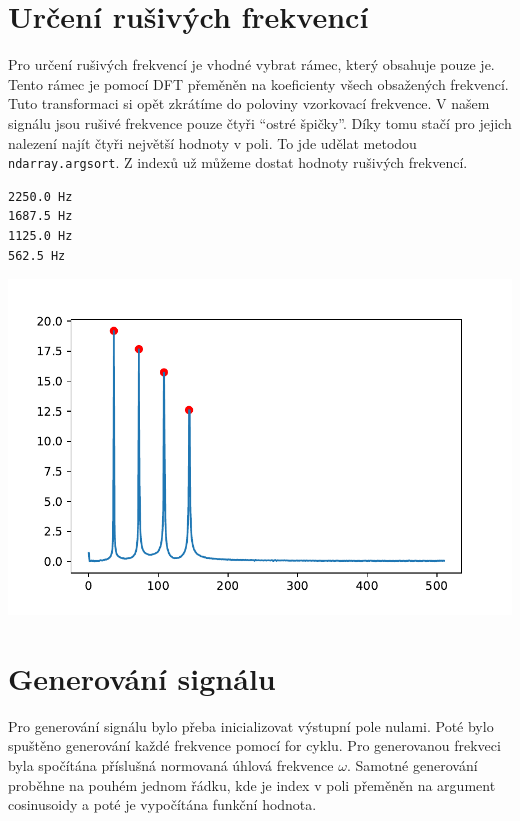 \documentclass[12pt,a4paper]{article}
\begin{document}
		\newpage
	
	
	\section{Určení rušivých frekvencí}
		Pro určení rušivých frekvencí je vhodné vybrat rámec, který obsahuje pouze je.
		Tento rámec je pomocí DFT přeměněn na koeficienty všech obsažených frekvencí.
		Tuto transformaci si opět zkrátíme do poloviny vzorkovací frekvence.
		V našem signálu jsou rušivé frekvence pouze čtyři \enquote{ostré špičky}.
		Díky tomu stačí pro jejich nalezení najít čtyři největší hodnoty v poli.
		To jde udělat metodou \texttt{ndarray.argsort}.
		Z indexů už můžeme dostat hodnoty rušivých frekvencí.
		
		\begin{verbatim}
2250.0 Hz
1687.5 Hz
1125.0 Hz
562.5 Hz
		\end{verbatim}
		
		\includegraphics{img/peaks.pdf}
		
		\newpage
		
	
	
	\section{Generování signálu}
		Pro generování signálu bylo přeba inicializovat výstupní pole nulami.
		Poté bylo spuštěno generování každé frekvence pomocí for cyklu.
		Pro generovanou frekveci byla spočítána příslušná normovaná úhlová frekvence \(\omega\).
		Samotné generování proběhne na pouhém jednom řádku, kde je index v poli přeměněn na argument cosinusoidy a poté je vypočítána funkční hodnota.
		
\end{document}
